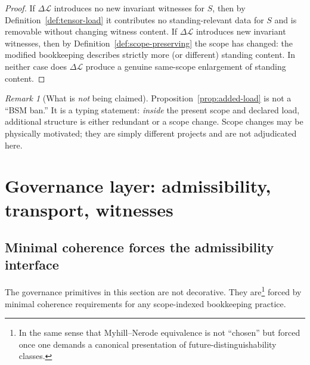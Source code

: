 \documentclass[11pt]{article}
\theoremstyle{remark}
\newtheorem{remark}[definition]{Remark}
\newcommand{\Load}{\mathcal{L}}
\begin{document}
\begin{proof}
If $\Delta\Load$ introduces no new invariant witnesses for $S$, then by Definition~\ref{def:tensor-load}
it contributes no standing-relevant data for $S$ and is removable without changing witness content.
If $\Delta\Load$ introduces new invariant witnesses, then by Definition~\ref{def:scope-preserving} the
scope has changed: the modified bookkeeping describes strictly more (or different) standing content.
In neither case does $\Delta\Load$ produce a genuine same-scope enlargement of standing content.
\end{proof}


\begin{remark}[What is \emph{not} being claimed]\label{rem:not-bsm-ban}
Proposition~\ref{prop:added-load} is not a ``BSM ban.'' It is a typing statement:
\emph{inside} the present scope and declared load, additional structure is either redundant or a scope
change. Scope changes may be physically motivated; they are simply different projects and are not
adjudicated here.
\end{remark}
\section{Governance layer: admissibility, transport, witnesses}

\subsection{Minimal coherence forces the admissibility interface}\label{sec:min-coherence}

The governance primitives in this section are not decorative. They are\footnote{In the same sense that
Myhill--Nerode equivalence is not ``chosen'' but forced once one demands a canonical presentation of
future-distinguishability classes.} forced by minimal coherence requirements for any scope-indexed
bookkeeping practice.
\end{document}
